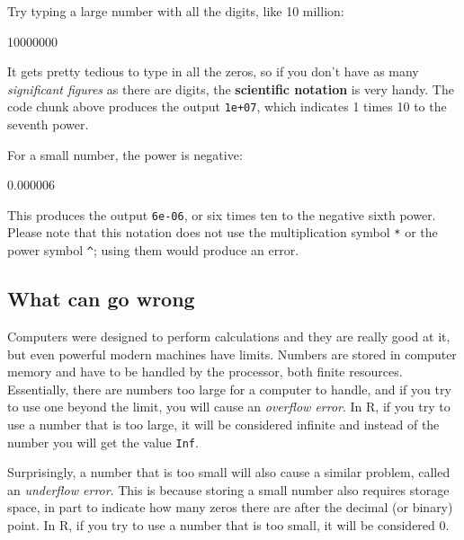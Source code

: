 \documentclass[
  letterpaper,
  DIV=11,
  numbers=noendperiod]{scrreprt}
\newenvironment{Shaded}{\begin{snugshade}}{\end{snugshade}}
\newcommand{\NormalTok}[1]{\textcolor[rgb]{0.00,0.23,0.31}{#1}}
\begin{document}
Try typing a large number with all the digits, like 10 million:

\begin{Shaded}
\begin{Highlighting}[]
\NormalTok{10000000}
\end{Highlighting}
\end{Shaded}

It gets pretty tedious to type in all the zeros, so if you don't have as
many \emph{significant figures} as there are digits, the
\textbf{scientific notation} is very handy. The code chunk above
produces the output \texttt{1e+07}, which indicates 1 times 10 to the
seventh power.

For a small number, the power is negative:

\begin{Shaded}
\begin{Highlighting}[]
\NormalTok{0.000006}
\end{Highlighting}
\end{Shaded}

This produces the output \texttt{6e-06}, or six times ten to the
negative sixth power. Please note that this notation does not use the
multiplication symbol \texttt{*} or the power symbol \texttt{\^{}};
using them would produce an error.

\hypertarget{what-can-go-wrong}{%
\subsection*{What can go wrong}\label{what-can-go-wrong}}

Computers were designed to perform calculations and they are really good
at it, but even powerful modern machines have limits. Numbers are stored
in computer memory and have to be handled by the processor, both finite
resources. Essentially, there are numbers too large for a computer to
handle, and if you try to use one beyond the limit, you will cause an
\emph{overflow error}. In R, if you try to use a number that is too
large, it will be considered infinite and instead of the number you will
get the value \texttt{Inf}.

Surprisingly, a number that is too small will also cause a similar
problem, called an \emph{underflow error}. This is because storing a
small number also requires storage space, in part to indicate how many
zeros there are after the decimal (or binary) point. In R, if you try to
use a number that is too small, it will be considered 0.
\end{document}
